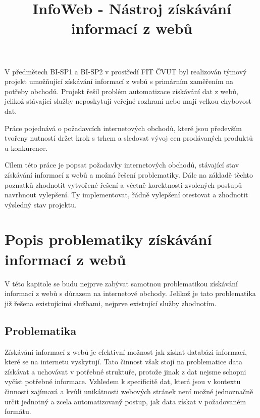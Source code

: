 \documentclass[thesis=B,czech]{FITthesis}[2012/06/26]
\title{ InfoWeb - Nástroj získávání informací z webů }
\begin{document}

\begin{introduction}
V předmětech BI-SP1 a BI-SP2 v prostředí FIT ČVUT byl realizován týmový projekt umožňující získávání informací z webů s primárním zaměřením na potřeby obchodů. Projekt řešil problém automatizace získávání dat z webů, jelikož stávající služby neposkytují veřejné rozhraní
nebo mají velkou chybovost dat.
\par
Práce pojednává o požadavcích internetových obchodů, které jsou především tvořeny nutností držet krok s trhem a sledovat vývoj cen
prodávaných produktů u konkurence.
\par
Cílem této práce je popsat požadavky internetových obchodů, stávající stav získávání informací z webů a možná řešení problematiky. Dále na základě těchto poznatků zhodnotit vytvořené řešení a včetně korektnosti zvolených postupů navrhnout vylepšení. Ty implementovat, řádně vylepšení
otestovat a zhodnotit výsledný stav projektu.


\newpage

\end{introduction}


\chapter{Popis problematiky získávání informací z webů}

V této kapitole se budu nejprve zabývat samotnou problematikou získávání informací 
z webů s důrazem na internetové obchody.
Jelikož je tato problematika již řešena existujícími službami, nejprve existující služby zhodnotím.

\section{Problematika}
Získávání informací z webů je efektivní možnost jak získat databázi informací, které se na internetu vyskytují.
Tato činnost však stojí na problematice data získávat a uchovávat v potřebné struktuře, protože 
jinak z dat nejsme schopni vyčíst potřebné informace.
Vzhledem k specificitě dat, která jsou v kontextu činnosti zajímavá a kvůli unikátnosti webových stránek
není možné jednoznačně určit jednotný a zcela automatizovaný postup, jak data získat v požadovaném formátu.
\end{document}
